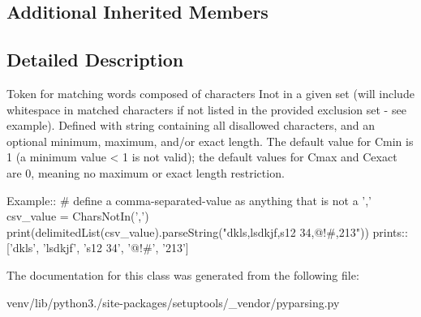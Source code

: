 \subsection*{Additional Inherited Members}


\subsection{Detailed Description}
\begin{DoxyVerb}Token for matching words composed of characters I{not} in a given set (will
include whitespace in matched characters if not listed in the provided exclusion set - see example).
Defined with string containing all disallowed characters, and an optional
minimum, maximum, and/or exact length.  The default value for C{min} is 1 (a
minimum value < 1 is not valid); the default values for C{max} and C{exact}
are 0, meaning no maximum or exact length restriction.

Example::
    # define a comma-separated-value as anything that is not a ','
    csv_value = CharsNotIn(',')
    print(delimitedList(csv_value).parseString("dkls,lsdkjf,s12 34,@!#,213"))
prints::
    ['dkls', 'lsdkjf', 's12 34', '@!#', '213']
\end{DoxyVerb}
 

The documentation for this class was generated from the following file\+:\begin{DoxyCompactItemize}
\item 
venv/lib/python3./site-\/packages/setuptools/\+\_\+vendor/pyparsing.\+py\end{DoxyCompactItemize}
